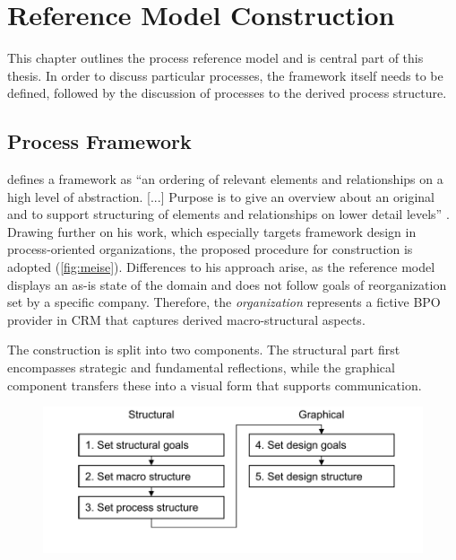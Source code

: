 
\chapter{Reference Model Construction}
\label{chap:refmod}
This chapter outlines the process reference model and is central part of this thesis. In order to discuss particular processes, the framework itself needs to be defined, followed by the discussion of processes \wrt to the derived process structure.


	\section{Process Framework}
	
	\citeauthor{Meise2001} defines a framework as \enquote{an ordering of relevant elements and relationships on a high level of abstraction. [...] Purpose is to give an overview about an original and to support structuring of elements and relationships on lower detail levels} \citep[]{Meise2001}. Drawing further on his work, which especially targets framework design in process-oriented organizations, the proposed procedure for construction is adopted (\Fig \ref{fig:meise}). Differences to his approach arise, as the reference model displays an as-is state of the domain and does not follow goals of reorganization set by a specific company. Therefore, the \textit{organization} represents a fictive BPO provider in CRM that captures derived macro-structural aspects. 
	
	The construction is split into two components. The structural part first encompasses strategic and fundamental reflections, while the graphical component transfers these into a visual form that supports communication.

	\begin{figure}[caption={Procedure for Framework Construction}, label={fig:meise}]
		{	\includegraphics[width=.8\textwidth]{figures/framework-meise.pdf}}
		\parbox{0.7\textwidth }{}
	\end{figure} 
	
